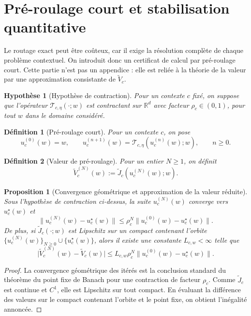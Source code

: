 \documentclass[11pt,a4paper]{article}
\newtheorem{definition}{Définition}[section]
\newtheorem{assumption}{Hypothèse}[section]
\newtheorem{proposition}{Proposition}[section]
\newcommand{\R}{\mathbb R}
\newcommand{\Tcal}{\mathcal T}
\begin{document}
\section{Pré-roulage court et stabilisation quantitative}

Le routage exact peut être coûteux, car il exige la résolution complète de chaque problème contextuel. On introduit donc un certificat de calcul par pré-roulage court. Cette partie n'est pas un appendice : elle est reliée à la théorie de la valeur par une approximation consistante de \(\widetilde V_c\).

\begin{assumption}[Hypothèse de contraction]
Pour un contexte \(c\) fixé, on suppose que l'opérateur \(\Tcal_{c,\eta}(\cdot;w)\) est contractant sur \(\R^d\) avec facteur \(\rho_c\in(0,1)\), pour tout \(w\) dans le domaine considéré.
\end{assumption}

\begin{definition}[Pré-roulage court]
Pour un contexte \(c\), on pose
\[
u_c^{(0)}(w)=w,
\qquad
u_c^{(n+1)}(w)=\Tcal_{c,\eta}(u_c^{(n)}(w);w),
\qquad n\ge 0.
\]
\end{definition}

\begin{definition}[Valeur de pré-roulage]
Pour un entier \(N\ge 1\), on définit
\[
\widetilde V_c^{(N)}(w):=\widetilde J_c(u_c^{(N)}(w);w).
\]
\end{definition}

\begin{proposition}[Convergence géométrique et approximation de la valeur réduite]
Sous l'hypothèse de contraction ci-dessus, la suite \(u_c^{(N)}(w)\) converge vers \(u_c^\star(w)\) et
\[
\|u_c^{(N)}(w)-u_c^\star(w)\|\le \rho_c^N\|u_c^{(0)}(w)-u_c^\star(w)\|.
\]
De plus, si \(\widetilde J_c(\cdot;w)\) est Lipschitz sur un compact contenant l'orbite \(\{u_c^{(N)}(w)\}_{N\ge 0}\cup\{u_c^\star(w)\}\), alors il existe une constante \(L_{c,w}<\infty\) telle que
\[
\bigl|\widetilde V_c^{(N)}(w)-\widetilde V_c(w)\bigr|
\le
L_{c,w}\rho_c^N\|u_c^{(0)}(w)-u_c^\star(w)\|.
\]
\end{proposition}

\begin{proof}
La convergence géométrique des itérés est la conclusion standard du théorème du point fixe de Banach pour une contraction de facteur \(\rho_c\). Comme \(\widetilde J_c\) est continue et \(C^1\), elle est Lipschitz sur tout compact. En évaluant la différence des valeurs sur le compact contenant l'orbite et le point fixe, on obtient l'inégalité annoncée.
\end{proof}
\end{document}
